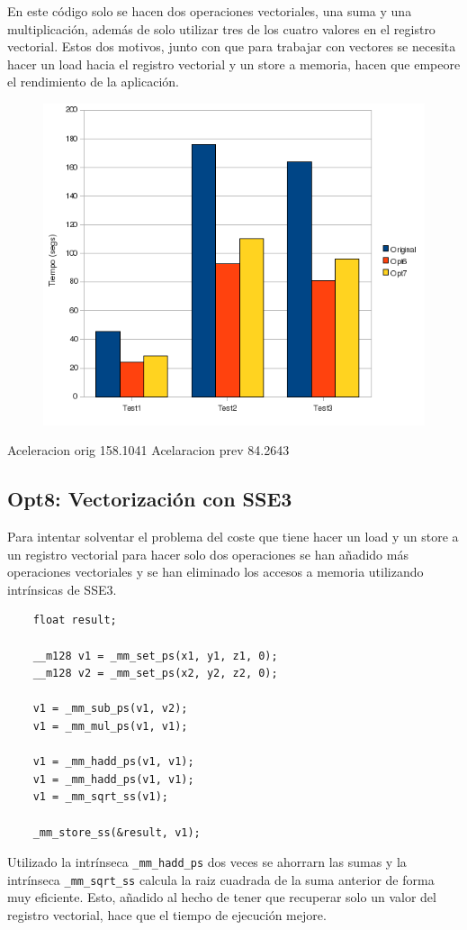 En este c\'{o}digo solo se hacen dos operaciones vectoriales, una suma y una
multiplicaci\'{o}n, adem\'{a}s de solo utilizar tres de los cuatro valores en
el registro vectorial. Estos dos motivos, junto con que para trabajar con
vectores se necesita hacer un load hacia el registro vectorial y un store a
memoria, hacen que empeore el rendimiento de la aplicaci\'{o}n.

\begin{figure}[ht]
   \centering
   \includegraphics[keepaspectratio=true,width=.6\textwidth]{figures/opt7-perf}
\end{figure}

Aceleracion orig	158.1041%
Acelaracion prev	84.2643%

\subsection{Opt8: Vectorizaci\'{o}n con SSE3}

Para intentar solventar el problema del coste que tiene hacer un load y un store
a un registro vectorial para hacer solo dos operaciones se han a\~{n}adido
m\'{a}s operaciones vectoriales y se han eliminado los accesos a memoria
utilizando intr\'{i}nsicas de SSE3.

\begin{lstlisting}
	float result;
	
	__m128 v1 = _mm_set_ps(x1, y1, z1, 0);
	__m128 v2 = _mm_set_ps(x2, y2, z2, 0);
	
	v1 = _mm_sub_ps(v1, v2);
	v1 = _mm_mul_ps(v1, v1);

	v1 = _mm_hadd_ps(v1, v1);
	v1 = _mm_hadd_ps(v1, v1);
	v1 = _mm_sqrt_ss(v1);	
	
	_mm_store_ss(&result, v1);
\end{lstlisting}

Utilizado la intr\'{i}nseca \texttt{\_mm\_hadd\_ps} dos veces se ahorrarn las
sumas y la intr\'{i}nseca \texttt{\_mm\_sqrt\_ss} calcula la raiz cuadrada de la
suma anterior de forma muy eficiente. Esto, a\~{n}adido al hecho de tener que
recuperar solo un valor del registro vectorial, hace que el tiempo de
ejecuci\'{o}n mejore.

